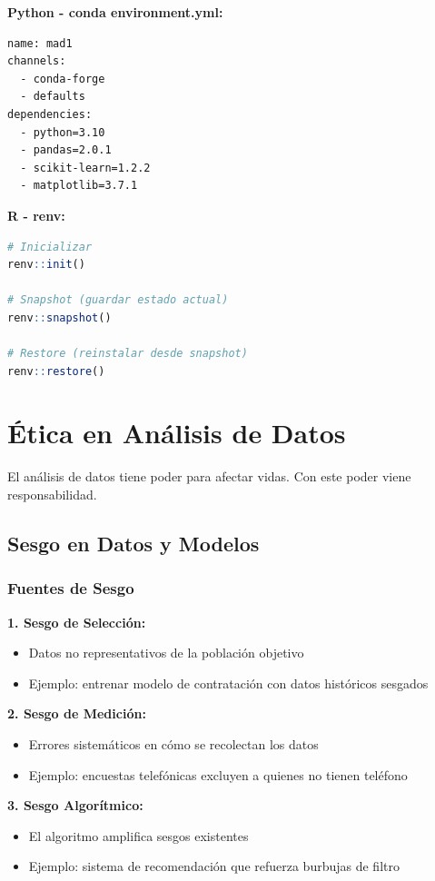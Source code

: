 \documentclass[11pt,a4paper]{article}
\begin{document}
\textbf{Python - conda environment.yml:}
\begin{lstlisting}
name: mad1
channels:
  - conda-forge
  - defaults
dependencies:
  - python=3.10
  - pandas=2.0.1
  - scikit-learn=1.2.2
  - matplotlib=3.7.1
\end{lstlisting}

\textbf{R - renv:}
\begin{lstlisting}[language=R]
# Inicializar
renv::init()

# Snapshot (guardar estado actual)
renv::snapshot()

# Restore (reinstalar desde snapshot)
renv::restore()
\end{lstlisting}

\section{Ética en Análisis de Datos}

El análisis de datos tiene poder para afectar vidas. Con este poder viene responsabilidad.

\subsection{Sesgo en Datos y Modelos}

\subsubsection{Fuentes de Sesgo}

\textbf{1. Sesgo de Selección:}
\begin{itemize}
\item Datos no representativos de la población objetivo
\item Ejemplo: entrenar modelo de contratación con datos históricos sesgados
\end{itemize}

\textbf{2. Sesgo de Medición:}
\begin{itemize}
\item Errores sistemáticos en cómo se recolectan los datos
\item Ejemplo: encuestas telefónicas excluyen a quienes no tienen teléfono
\end{itemize}

\textbf{3. Sesgo Algorítmico:}
\begin{itemize}
\item El algoritmo amplifica sesgos existentes
\item Ejemplo: sistema de recomendación que refuerza burbujas de filtro
\end{itemize}
\end{document}
